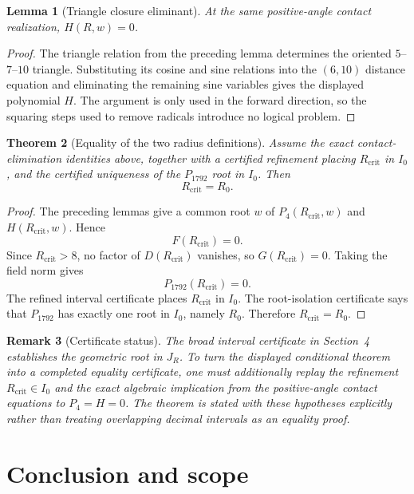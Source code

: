 \documentclass[11pt,a4paper]{article}
\newtheorem{theorem}{Theorem}[section]
\newtheorem{lemma}[theorem]{Lemma}
\newtheorem{remark}[theorem]{Remark}
\begin{document}
\begin{lemma}[Triangle closure eliminant]
At the same positive-angle contact realization, $H(R,w)=0$.
\end{lemma}
\begin{proof}
The triangle relation from the preceding lemma determines the oriented
$5$--$7$--$10$ triangle.  Substituting its cosine and sine relations into the
$(6,10)$ distance equation and eliminating the remaining sine variables gives
the displayed polynomial $H$.  The argument is only used in the forward
direction, so the squaring steps used to remove radicals introduce no logical
problem.
\end{proof}

\begin{theorem}[Equality of the two radius definitions]
Assume the exact contact-elimination identities above, together with a
certified refinement placing $R_{\mathrm{crit}}$ in $I_0$, and the certified
uniqueness of the $P_{1792}$ root in $I_0$.  Then
\[
 \boxed{R_{\mathrm{crit}}=R_0}.
\]
\end{theorem}
\begin{proof}
The preceding lemmas give a common root $w$ of $P_4(R_{\mathrm{crit}},w)$ and
$H(R_{\mathrm{crit}},w)$.  Hence
\[
F(R_{\mathrm{crit}})=0.
\]
Since $R_{\mathrm{crit}}>8$, no factor of $D(R_{\mathrm{crit}})$ vanishes,
so $G(R_{\mathrm{crit}})=0$.  Taking the field norm gives
\[
P_{1792}(R_{\mathrm{crit}})=0.
\]
The refined interval certificate places $R_{\mathrm{crit}}$ in $I_0$.
The root-isolation certificate says that $P_{1792}$ has exactly one root in
$I_0$, namely $R_0$.  Therefore $R_{\mathrm{crit}}=R_0$.
\end{proof}

\begin{remark}[Certificate status]
The broad interval certificate in Section~4 establishes the geometric root in
$J_R$.  To turn the displayed conditional theorem into a completed equality
certificate, one must additionally replay the refinement
$R_{\mathrm{crit}}\in I_0$ and the exact algebraic implication from the
positive-angle contact equations to $P_4=H=0$.  The theorem is stated with
these hypotheses explicitly rather than treating overlapping decimal
intervals as an equality proof.
\end{remark}

\section{Conclusion and scope}
\end{document}
